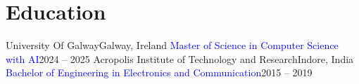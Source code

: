 \section{Education}
  \resumeSubHeadingListStart
    \resumeSubheading
      {University Of Galway}{Galway, Ireland}
      {\textcolor{Blue}{Master of Science in Computer Science with AI}}{2024 -- 2025}
    \resumeSubheading
      {Acropolis Institute of Technology and Research}{Indore, India}
      {\textcolor{Blue}{Bachelor of Engineering in Electronics and Communication}}{2015 -- 2019}
  \resumeSubHeadingListEnd